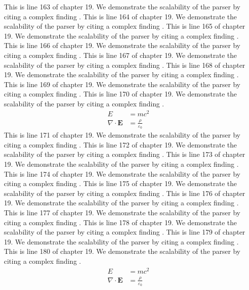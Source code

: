This is line 163 of chapter 19. We demonstrate the scalability of the parser by citing a complex finding \cite{ref19_163}.
This is line 164 of chapter 19. We demonstrate the scalability of the parser by citing a complex finding \cite{ref19_164}.
This is line 165 of chapter 19. We demonstrate the scalability of the parser by citing a complex finding \cite{ref19_165}.
This is line 166 of chapter 19. We demonstrate the scalability of the parser by citing a complex finding \cite{ref19_166}.
This is line 167 of chapter 19. We demonstrate the scalability of the parser by citing a complex finding \cite{ref19_167}.
This is line 168 of chapter 19. We demonstrate the scalability of the parser by citing a complex finding \cite{ref19_168}.
This is line 169 of chapter 19. We demonstrate the scalability of the parser by citing a complex finding \cite{ref19_169}.
This is line 170 of chapter 19. We demonstrate the scalability of the parser by citing a complex finding \cite{ref19_170}.
\begin{align*}
  E &= mc^2 \\
  \nabla \cdot \mathbf{E} &= \frac{\rho}{\varepsilon_0}
\end{align*}
This is line 171 of chapter 19. We demonstrate the scalability of the parser by citing a complex finding \cite{ref19_171}.
This is line 172 of chapter 19. We demonstrate the scalability of the parser by citing a complex finding \cite{ref19_172}.
This is line 173 of chapter 19. We demonstrate the scalability of the parser by citing a complex finding \cite{ref19_173}.
This is line 174 of chapter 19. We demonstrate the scalability of the parser by citing a complex finding \cite{ref19_174}.
This is line 175 of chapter 19. We demonstrate the scalability of the parser by citing a complex finding \cite{ref19_175}.
This is line 176 of chapter 19. We demonstrate the scalability of the parser by citing a complex finding \cite{ref19_176}.
This is line 177 of chapter 19. We demonstrate the scalability of the parser by citing a complex finding \cite{ref19_177}.
This is line 178 of chapter 19. We demonstrate the scalability of the parser by citing a complex finding \cite{ref19_178}.
This is line 179 of chapter 19. We demonstrate the scalability of the parser by citing a complex finding \cite{ref19_179}.
This is line 180 of chapter 19. We demonstrate the scalability of the parser by citing a complex finding \cite{ref19_180}.
\begin{align*}
  E &= mc^2 \\
  \nabla \cdot \mathbf{E} &= \frac{\rho}{\varepsilon_0}
\end{align*}
